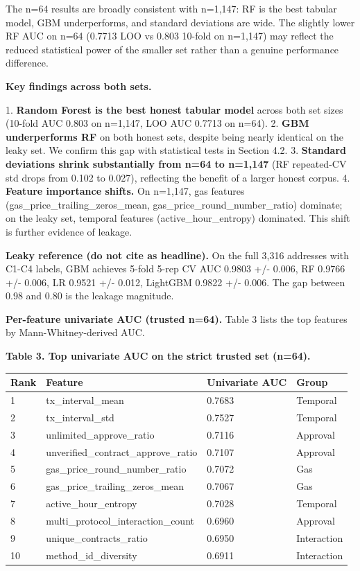 \documentclass[sigconf,nonacm=false]{acmart}
\begin{document}
The n=64 results are broadly consistent with n=1,147: RF is the best tabular model, GBM underperforms, and standard deviations are wide. The slightly lower RF AUC on n=64 (0.7713 LOO vs 0.803 10-fold on n=1,147) may reflect the reduced statistical power of the smaller set rather than a genuine performance difference.

\textbf{Key findings across both sets.}

1. \textbf{Random Forest is the best honest tabular model} across both set sizes (10-fold AUC 0.803 on n=1,147, LOO AUC 0.7713 on n=64).
2. \textbf{GBM underperforms RF} on both honest sets, despite being nearly identical on the leaky set. We confirm this gap with statistical tests in Section 4.2.
3. \textbf{Standard deviations shrink substantially from n=64 to n=1,147} (RF repeated-CV std drops from 0.102 to 0.027), reflecting the benefit of a larger honest corpus.
4. \textbf{Feature importance shifts.} On n=1,147, gas features (gas\_price\_trailing\_zeros\_mean, gas\_price\_round\_number\_ratio) dominate; on the leaky set, temporal features (active\_hour\_entropy) dominated. This shift is further evidence of leakage.

\textbf{Leaky reference (do not cite as headline).} On the full 3,316 addresses with C1-C4 labels, GBM achieves 5-fold 5-rep CV AUC 0.9803 +/- 0.006, RF 0.9766 +/- 0.006, LR 0.9521 +/- 0.012, LightGBM 0.9822 +/- 0.006. The gap between 0.98 and 0.80 is the leakage magnitude.

\textbf{Per-feature univariate AUC (trusted n=64).} Table 3 lists the top features by Mann-Whitney-derived AUC.

\textbf{Table 3. Top univariate AUC on the strict trusted set (n=64).}

\begin{table}[h]
\centering
\small
\begin{tabular}{llll}
\toprule
Rank & Feature & Univariate AUC & Group \\
\midrule
1 & tx\_interval\_mean & 0.7683 & Temporal \\
2 & tx\_interval\_std & 0.7527 & Temporal \\
3 & unlimited\_approve\_ratio & 0.7116 & Approval \\
4 & unverified\_contract\_approve\_ratio & 0.7107 & Approval \\
5 & gas\_price\_round\_number\_ratio & 0.7072 & Gas \\
6 & gas\_price\_trailing\_zeros\_mean & 0.7067 & Gas \\
7 & active\_hour\_entropy & 0.7028 & Temporal \\
8 & multi\_protocol\_interaction\_count & 0.6960 & Approval \\
9 & unique\_contracts\_ratio & 0.6950 & Interaction \\
10 & method\_id\_diversity & 0.6911 & Interaction \\
\bottomrule
\end{tabular}
\end{table}
\end{document}
